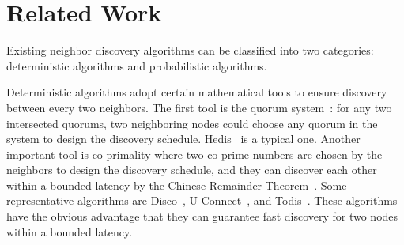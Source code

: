 \section{Related Work}
\label{RW}








Existing neighbor discovery algorithms can be classified into two
categories: deterministic algorithms and probabilistic algorithms.

Deterministic algorithms adopt certain mathematical tools to ensure
discovery between every two neighbors. The first tool is the quorum
system~\cite{jiang2005quorum,luk1997two}: for any two intersected
quorums, two neighboring nodes could choose any quorum in the system to
design the discovery schedule. Hedis~\cite{chen2015heterogeneous} is a
typical one. Another important tool is co-primality where two co-prime
numbers are chosen by the neighbors to design the discovery schedule,
and they can discover each other within a bounded latency by the Chinese
Remainder Theorem~\cite{ding1996chinese}. Some representative algorithms
are Disco~\cite{dutta2008practical}, U-Connect~\cite{kandhalu2010u}, and
Todis~\cite{chen2015heterogeneous}. These algorithms have the obvious
advantage that they can guarantee fast discovery for two nodes within a
bounded latency.

